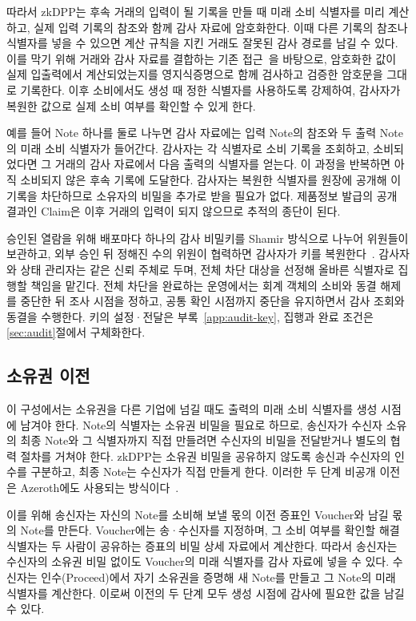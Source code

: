 따라서 zkDPP는 후속 거래의 입력이 될 기록을 만들 때 미래 소비 식별자를 미리 계산하고, 실제 입력 기록의 참조와 함께 감사 자료에 암호화한다. 이때 다른 기록의 참조나 식별자를 넣을 수 있으면 계산 규칙을 지킨 거래도 잘못된 감사 경로를 남길 수 있다. 이를 막기 위해 거래와 감사 자료를 결합하는 기존 접근~\cite{garman-accountable-privacy-2017,jeong-azeroth-2023}을 바탕으로, 암호화한 값이 실제 입출력에서 계산되었는지를 영지식증명으로 함께 검사하고 검증한 암호문을 그대로 기록한다. 이후 소비에서도 생성 때 정한 식별자를 사용하도록 강제하여, 감사자가 복원한 값으로 실제 소비 여부를 확인할 수 있게 한다.

예를 들어 Note 하나를 둘로 나누면 감사 자료에는 입력 Note의 참조와 두 출력 Note의 미래 소비 식별자가 들어간다. 감사자는 각 식별자로 소비 기록을 조회하고, 소비되었다면 그 거래의 감사 자료에서 다음 출력의 식별자를 얻는다. 이 과정을 반복하면 아직 소비되지 않은 후속 기록에 도달한다. 감사자는 복원한 식별자를 원장에 공개해 이 기록을 차단하므로 소유자의 비밀을 추가로 받을 필요가 없다. 제품정보 발급의 공개 결과인 Claim은 이후 거래의 입력이 되지 않으므로 추적의 종단이 된다.

승인된 열람을 위해 배포마다 하나의 감사 비밀키를 Shamir 방식으로 나누어 위원들이 보관하고, 외부 승인 뒤 정해진 수의 위원이 협력하면 감사자가 키를 복원한다~\cite{shamir-secret-sharing-1979}. 감사자와 상태 관리자는 같은 신뢰 주체로 두며, 전체 차단 대상을 선정해 올바른 식별자로 집행할 책임을 맡긴다. 전체 차단을 완료하는 운영에서는 회계 객체의 소비와 동결 해제를 중단한 뒤 조사 시점을 정하고, 공통 확인 시점까지 중단을 유지하면서 감사 조회와 동결을 수행한다. 키의 설정·전달은 부록~\ref{app:audit-key}, 집행과 완료 조건은 \ref{sec:audit}절에서 구체화한다.

\subsection{소유권 이전}

이 구성에서는 소유권을 다른 기업에 넘길 때도 출력의 미래 소비 식별자를 생성 시점에 남겨야 한다. Note의 식별자는 소유권 비밀을 필요로 하므로, 송신자가 수신자 소유의 최종 Note와 그 식별자까지 직접 만들려면 수신자의 비밀을 전달받거나 별도의 협력 절차를 거쳐야 한다. zkDPP는 소유권 비밀을 공유하지 않도록 송신과 수신자의 인수를 구분하고, 최종 Note는 수신자가 직접 만들게 한다. 이러한 두 단계 비공개 이전은 Azeroth에도 사용되는 방식이다~\cite{jeong-azeroth-2023}.

이를 위해 송신자는 자신의 Note를 소비해 보낼 몫의 이전 증표인 Voucher와 남길 몫의 Note를 만든다. Voucher에는 송·수신자를 지정하며, 그 소비 여부를 확인할 해결 식별자는 두 사람이 공유하는 증표의 비밀 상세 자료에서 계산한다. 따라서 송신자는 수신자의 소유권 비밀 없이도 Voucher의 미래 식별자를 감사 자료에 넣을 수 있다. 수신자는 인수(Proceed)에서 자기 소유권을 증명해 새 Note를 만들고 그 Note의 미래 식별자를 계산한다. 이로써 이전의 두 단계 모두 생성 시점에 감사에 필요한 값을 남길 수 있다.

